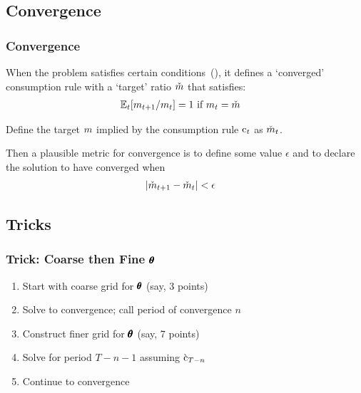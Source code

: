 \documentclass{beamer}
\providecommand{\Ex}{\ensuremath{\mathbb{E}}} %
\begin{document}
\subsection{Convergence}
\begin{frame}
\frametitle{Convergence}

When the problem satisfies certain conditions~(\cite{BufferStockTheory}),
it defines a `converged' consumption rule with a `target' ratio $\check{m}$
that satisfies:
\begin{equation}\begin{gathered}\begin{aligned}
  \Ex_{t}[\mRat_{t+1}/\mRat_{t}]  & = 1 \text{~if $\mRat_{t} = \check{\mRat}$}
\end{aligned}\end{gathered}\end{equation}

\pause 

Define the target $m$ implied by the consumption rule $\mathrm{c}_{t}$ as $\check{m}_{t}$.

\medskip\pause
Then a plausible metric for convergence is to define some value $\epsilon$ and to declare
the solution to have converged when
\begin{equation}\begin{gathered}\begin{aligned}
  |\check{m}_{t+1}-\check{m}_{t}|  & < \epsilon
\end{aligned}\end{gathered}\end{equation}

\end{frame}

\subsection{Tricks}
\begin{frame}
\frametitle{Trick: Coarse then Fine $\pmb{\theta}$}

\begin{enumerate}
\item Start with coarse grid for $\pmb{\theta}$ (say, 3 points)
\item Solve to convergence; call period of convergence $n$
\item Construct finer grid for $\pmb{\theta}$ (say, 7 points)
\item Solve for period $T-n-1$ assuming $\grave{\mathrm{c}}_{T-n}$ 
\item Continue to convergence
\end{enumerate}

\end{frame}
\end{document}
